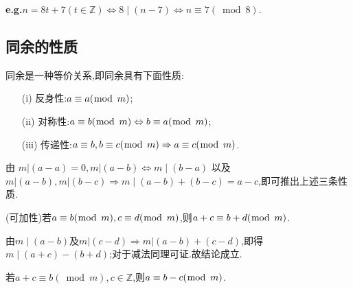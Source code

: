\textbf{e.g.}$n=8t+7(t\in\mathbb{Z})\Leftrightarrow 8\mid(n-7)\Leftrightarrow n\equiv 7(\bmod 8)$.

\subsection{同余的性质}
\theorem 同余是一种等价关系,即同余具有下面性质:
\begin{enumerate}[itemindent=2em]
	\item[(i)] 反身性:$a \equiv a(\bmod \hspace{1ex}m)$;
	\item[(ii)] 对称性:$a \equiv b(\bmod \hspace{1ex}m) \Leftrightarrow b \equiv a(\bmod \hspace{1ex}m)$;
	\item[(iii)] 传递性:$a \equiv b, b \equiv c(\bmod \hspace{1ex}m) \Rightarrow a \equiv c(\bmod \hspace{1ex}m)$.
\end{enumerate}

\proof 由 $m|(a-a)=0, m|(a-b) \Leftrightarrow m \mid(b-a)$ 以及 $m|(a-b), m|(b-c) \Rightarrow m \mid(a-b)+(b-c)=a-c$,即可推出上述三条性质.

\theorem (可加性)若$a \equiv b(\bmod \hspace{1ex}m), c \equiv d(\bmod \hspace{1ex}m)$,则$a+c \equiv b+d(\bmod \hspace{1ex}m)$.

\proof 由$m \mid(a-b)$及$m|(c-d) \Rightarrow m|(a-b)+(c-d)$,即得$m \mid(a+c)-(b+d)$;对于减法同理可证.故结论成立.

\corollary 若$a+c \equiv b(\bmod m), c \in \mathbb{Z}$,则$a \equiv b-c(\bmod \hspace{1ex}m)$.

